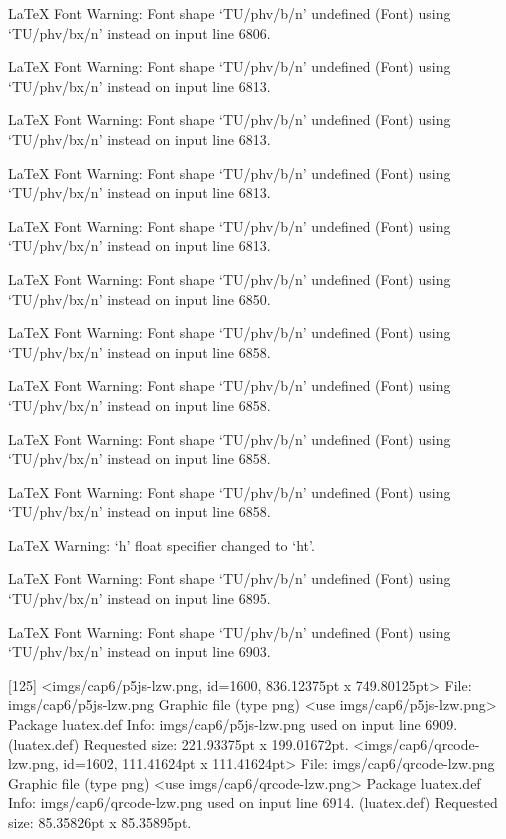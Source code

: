 LaTeX Font Warning: Font shape `TU/phv/b/n' undefined
(Font)              using `TU/phv/bx/n' instead on input line 6806.


LaTeX Font Warning: Font shape `TU/phv/b/n' undefined
(Font)              using `TU/phv/bx/n' instead on input line 6813.


LaTeX Font Warning: Font shape `TU/phv/b/n' undefined
(Font)              using `TU/phv/bx/n' instead on input line 6813.


LaTeX Font Warning: Font shape `TU/phv/b/n' undefined
(Font)              using `TU/phv/bx/n' instead on input line 6813.


LaTeX Font Warning: Font shape `TU/phv/b/n' undefined
(Font)              using `TU/phv/bx/n' instead on input line 6813.


LaTeX Font Warning: Font shape `TU/phv/b/n' undefined
(Font)              using `TU/phv/bx/n' instead on input line 6850.


LaTeX Font Warning: Font shape `TU/phv/b/n' undefined
(Font)              using `TU/phv/bx/n' instead on input line 6858.


LaTeX Font Warning: Font shape `TU/phv/b/n' undefined
(Font)              using `TU/phv/bx/n' instead on input line 6858.


LaTeX Font Warning: Font shape `TU/phv/b/n' undefined
(Font)              using `TU/phv/bx/n' instead on input line 6858.


LaTeX Font Warning: Font shape `TU/phv/b/n' undefined
(Font)              using `TU/phv/bx/n' instead on input line 6858.


LaTeX Warning: `h' float specifier changed to `ht'.


LaTeX Font Warning: Font shape `TU/phv/b/n' undefined
(Font)              using `TU/phv/bx/n' instead on input line 6895.


LaTeX Font Warning: Font shape `TU/phv/b/n' undefined
(Font)              using `TU/phv/bx/n' instead on input line 6903.

[125]
<imgs/cap6/p5js-lzw.png, id=1600, 836.12375pt x 749.80125pt>
File: imgs/cap6/p5js-lzw.png Graphic file (type png)
<use imgs/cap6/p5js-lzw.png>
Package luatex.def Info: imgs/cap6/p5js-lzw.png  used on input line 6909.
(luatex.def)             Requested size: 221.93375pt x 199.01672pt.
<imgs/cap6/qrcode-lzw.png, id=1602, 111.41624pt x 111.41624pt>
File: imgs/cap6/qrcode-lzw.png Graphic file (type png)
<use imgs/cap6/qrcode-lzw.png>
Package luatex.def Info: imgs/cap6/qrcode-lzw.png  used on input line 6914.
(luatex.def)             Requested size: 85.35826pt x 85.35895pt.


